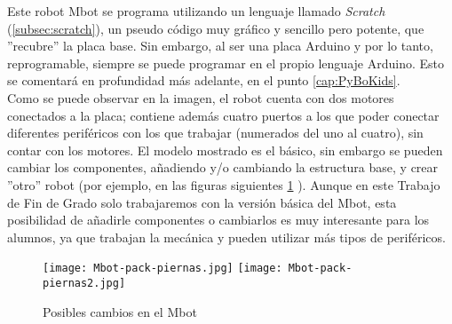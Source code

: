 Este robot Mbot se programa utilizando un  lenguaje llamado \textit{Scratch} (\ref{subsec:scratch}),  un pseudo código muy gráfico y sencillo pero potente, que ''recubre'' la placa base. Sin embargo, al ser una placa Arduino y por lo tanto, reprogramable, siempre se puede programar en el propio lenguaje Arduino. Esto  se comentará en profundidad más adelante, en el punto \ref{cap:PyBoKids}. \\
Como se puede observar en la imagen, el robot cuenta con dos motores conectados a la placa; contiene además cuatro puertos a los que poder conectar diferentes periféricos con los que trabajar (numerados del uno al cuatro), sin contar con los motores. El modelo mostrado es el básico, sin embargo se pueden cambiar los componentes, añadiendo y/o cambiando la estructura base, y crear ''otro'' robot (por ejemplo, en las figuras siguientes \ref{img:mbot2} ). Aunque en este Trabajo de Fin de Grado solo trabajaremos con la versión básica del Mbot, esta posibilidad de añadirle componentes o cambiarlos es muy interesante para los alumnos, ya que trabajan la mecánica y pueden utilizar más tipos de periféricos.
\begin{figure}[H]
	\texttt{[image: Mbot-pack-piernas.jpg]}
	\texttt{[image: Mbot-pack-piernas2.jpg]}
	\centering
	\label{img:mbot2}\caption{Posibles cambios en el Mbot}
\end{figure}
